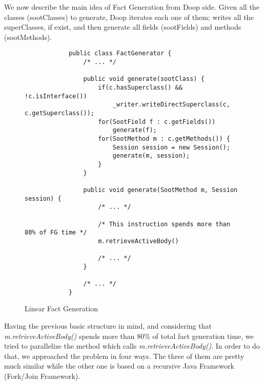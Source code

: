 \documentclass{dithesis}
\begin{document}
    We now describe the main idea of Fact Generation from Doop side. Given all the classes (sootClasses) to generate, Doop iterates each one of them; writes all the superClasses, if exist, and then generate all fields (sootFields) and methods (sootMethods). 
    \begin{figure}[H]
        \begin{lstlisting}
            public class FactGenerator {
                /* ... */

                public void generate(sootClass) {
                    if(c.hasSuperclass() && !c.isInterface())
                        _writer.writeDirectSuperclass(c, c.getSuperclass());
                    for(SootField f : c.getFields())
                        generate(f);
                    for(SootMethod m : c.getMethods()) {
                        Session session = new Session();
                        generate(m, session);
                    }
                }

                public void generate(SootMethod m, Session session) {
                    /* ... */
                    
                    /* This instruction spends more than 80% of FG time */
                    m.retrieveActiveBody() 
                    
                    /* ... */
                }

                /* ... */
            }
        \end{lstlisting}
    \caption{Linear Fact Generation}
    \end{figure}
    Having the previous basic structure in mind, and considering that \textit{m.retrieveActiveBody()} spends more than 80\% of total fact generation time, we tried to parallelize the method which calls \textit{m.retrieveActiveBody()}. In order to do that, we approached the problem in four ways. The three of them are pretty much similar while the other one is based on a recursive Java Framework (Fork/Join Framework). 
\end{document}
